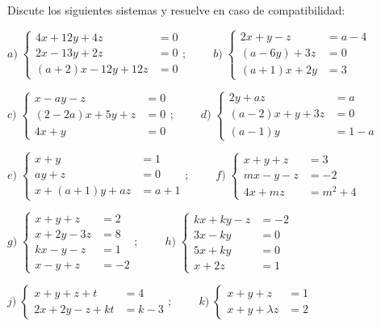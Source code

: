 \begin{ejre}

Discute los siguientes sistemas y resuelve en caso de compatibilidad:

\noindent $a)\; \begin{cases} 4x+12y+4z&=0\\2x-13y+2z&=0\\(a+2)x-12y+12z&=0    \end{cases}; \; \qquad
 b)\; \begin{cases}  2x+y-z&=a-4\\(a-6y)+3z&=0\\(a+1)x+2y&=3   \end{cases}$
 
 \noindent $c)\; \begin{cases} x-ay-z&=0\\(2-2a)x+5y+z&=0\\4x+y&=0    \end{cases}; \; \qquad
 d)\; \begin{cases}  2y+az&=a\\(a-2)x+y+3z&=0\\(a-1)y&=1-a   \end{cases}$
 
 \noindent $e)\; \begin{cases}  x+y&=1\\ay+z&=0\\x+(a+1)y+az&=a+1   \end{cases}; \; \qquad
 f)\; \begin{cases}  x+y+z&=3\\ mx-y-z&=-2 \\4x+mz&=m^2+4   \end{cases}$
 
 \noindent $g)\; \begin{cases}  x+y+z&=2\\x+2y-3z&=8\\kx-y-z&=1\\x-y+z&=-2   \end{cases}; \; \qquad
 h)\; \begin{cases}   kx+ky-z&=-2\\3x-ky&=0\\5x+ky&=0\\x+2z&=1  \end{cases}$
 
 \noindent $j)\; \begin{cases}  x+y+z+t&=4\\2x+2y-z+kt&=k-3   \end{cases}; \; \qquad
 k)\; \begin{cases}  x+y+z&=1\\x+y+\lambda z&=2   \end{cases}$
	
\end{ejre}

